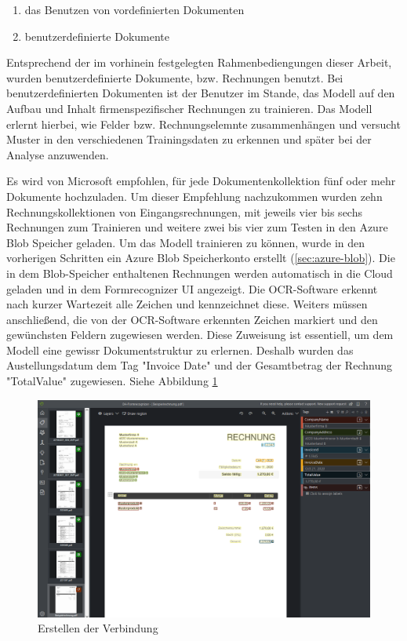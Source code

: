 \begin{enumerate}
    \item das Benutzen von vordefinierten Dokumenten 
    \item benutzerdefinierte Dokumente
\end{enumerate}

Entsprechend der im vorhinein festgelegten Rahmenbediengungen dieser Arbeit, wurden benutzerdefinierte Dokumente, bzw. Rechnungen benutzt.
Bei benutzerdefinierten Dokumenten ist der Benutzer im Stande, das Modell auf den Aufbau und Inhalt firmenspezifischer Rechnungen zu trainieren.
Das Modell erlernt hierbei, wie Felder bzw. Rechnungselemnte zusammenhängen und versucht Muster in den verschiedenen Trainingsdaten zu erkennen und später
bei der Analyse anzuwenden. 

Es wird von Microsoft empfohlen, für jede Dokumentenkollektion fünf oder mehr Dokumente hochzuladen. Um dieser Empfehlung nachzukommen wurden zehn Rechnungskollektionen
von Eingangsrechnungen, mit jeweils vier bis sechs Rechnungen zum Trainieren und weitere zwei bis vier zum Testen in den Azure Blob Speicher geladen.
Um das Modell trainieren zu können, wurde in den vorherigen Schritten ein Azure Blob Speicherkonto erstellt (\ref{sec:azure-blob}). Die in dem Blob-Speicher enthaltenen
Rechnungen werden automatisch in die Cloud geladen und in dem Formrecognizer UI angezeigt. Die OCR-Software erkennt nach kurzer Wartezeit alle Zeichen und kennzeichnet diese.
Weiters müssen anschließend, die von der OCR-Software erkennten Zeichen markiert und den gewünchsten Feldern zugewiesen werden. Diese Zuweisung ist essentiell, um dem Modell eine gewissr Dokumentstruktur zu erlernen. Deshalb wurden das Austellungsdatum dem Tag "Invoice Date" und der Gesamtbetrag der Rechnung "TotalValue" zugewiesen.
Siehe Abbildung \ref{fig:formrecognizer-invoice-tagging}

\begin{figure}[h]
    \centering
    \includegraphics[scale=0.4]{sections/cloud-computing/images/formrecognizer-invoice-tagging.PNG}
    \caption{Erstellen der Verbindung}
    \label{fig:formrecognizer-invoice-tagging}
\end{figure}

